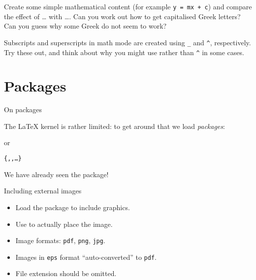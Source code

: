 
\begin{exercise}
  Create some simple mathematical content (for example \verb"y = mx + c") and compare the effect of \cs{(} \ldots \cs{)} with \cs{[} \ldots \cs{]}.
  Can you work out how to get capitalised Greek letters?
  Can you guess why some Greek do not seem to work?

  Subscripts and superscripts in math mode are created using \verb"_" and \verb"^", respectively.
  Try these out, and think about why you might use  rather than \verb"^" in some cases.

\end{exercise}


\section{Packages}

\begin{frame}[fragile]{On packages}

  The \LaTeX{} kernel is rather limited: to get around that we load \emph{packages}:
  \begin{semiverbatim}
  \end{semiverbatim}
  or
  \begin{semiverbatim}
	\texttt{\{,,\ldots\}}
  \end{semiverbatim}
  We have already seen the  package!

  \vspace{1 em}


\end{frame}

\begin{frame}[fragile]{Including external images}

  \begin{itemize}
	\item Load the  package to include graphics.
	\item Use  to actually place the image.
	\item Image formats: \texttt{pdf}, \texttt{png}, \texttt{jpg}.
	\item Images in \texttt{eps} format \enquote{auto-converted} to \texttt{pdf}.
	\item File extension should be omitted.
  \end{itemize}

  \vspace{1 em}

\end{frame}

